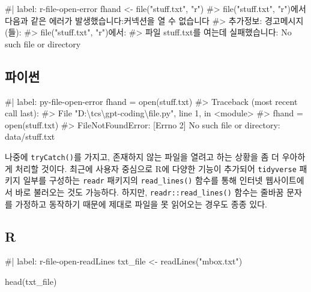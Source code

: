 \documentclass[
  letterpaper,
]{book}
\newenvironment{Shaded}{\begin{snugshade}}{\end{snugshade}}
\newcommand{\NormalTok}[1]{\textcolor[rgb]{0.00,0.23,0.31}{#1}}
\begin{document}
\begin{Shaded}
\begin{Highlighting}[]
\NormalTok{\#| label: r{-}file{-}open{-}error}
\NormalTok{fhand \textless{}{-} file("stuff.txt", "r")}
\NormalTok{\#\textgreater{} file("stuff.txt", "r")에서 다음과 같은 에러가 발생했습니다:커넥션을 열 수 없습니다}
\NormalTok{\#\textgreater{} 추가정보: 경고메시지(들): }
\NormalTok{\#\textgreater{} file("stuff.txt", "r")에서:}
\NormalTok{\#\textgreater{}   파일 \textquotesingle{}stuff.txt\textquotesingle{}를 여는데 실패했습니다: No such file or directory}
\end{Highlighting}
\end{Shaded}

\subsection{파이썬}

\begin{Shaded}
\begin{Highlighting}[]
\NormalTok{\#| label: py{-}file{-}open{-}error}
\NormalTok{fhand = open(\textquotesingle{}stuff.txt\textquotesingle{})}
\NormalTok{\#\textgreater{} Traceback (most recent call last):}
\NormalTok{\#\textgreater{}   File "D:\textbackslash{}tcs\textbackslash{}gpt{-}coding\textbackslash{}file.py", line 1, in \textless{}module\textgreater{}}
\NormalTok{\#\textgreater{}     fhand = open(\textquotesingle{}stuff.txt\textquotesingle{})}
\NormalTok{\#\textgreater{} FileNotFoundError: [Errno 2] No such file or directory: \textquotesingle{}data/stuff.txt\textquotesingle{}}
\end{Highlighting}
\end{Shaded}

나중에 \texttt{tryCatch()}를 가지고, 존재하지 않는 파일을 열려고 하는
상황을 좀 더 우아하게 처리할 것이다. 최근에 사용자 중심으로 R에 다양한
기능이 추가되어 \texttt{tidyverse} 패키지 일부를 구성하는 \texttt{readr}
패키지의 \texttt{read\_lines()} 함수를 통해 인터넷 웹사이트에서 바로
불러오는 것도 가능하다. 하지만, \texttt{readr::read\_lines()} 함수는
줄바꿈 문자를 가정하고 동작하기 때문에 제대로 파일을 못 읽어오는 경우도
종종 있다.

\subsection{R}

\begin{Shaded}
\begin{Highlighting}[]
\NormalTok{\#| label: r{-}file{-}open{-}readLines}
\NormalTok{txt\_file \textless{}{-} readLines("mbox.txt")}

\NormalTok{head(txt\_file)}
\end{Highlighting}
\end{Shaded}
\end{document}
